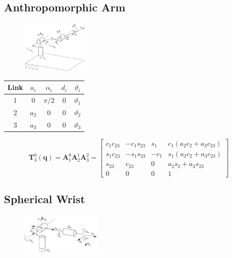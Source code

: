 \documentclass[10pt]{article}
\begin{document}
\subsection{Anthropomorphic Arm}

\begin{figure}[H]
    \centering
   \includegraphics[max width=0.3\textwidth]{./kinematics/anthropomorphic_arm}
\end{figure}

\begin{table}[h]
    \centering
\begin{tabular}{ccccc}
\hline
Link & $a_{i}$ & $\alpha_{i}$ & $d_{i}$ & $\vartheta_{i}$ \\
\hline
1 & 0 & $\pi / 2$ & 0 & $\vartheta_{1}$ \\
2 & $a_{2}$ & 0 & 0 & $\vartheta_{2}$ \\
3 & $a_{3}$ & 0 & 0 & $\vartheta_{3}$ \\
\hline
\end{tabular}
    \label{c1.l2.table.anthropomorphic}
\end{table}



$$
\boldsymbol{T}_{3}^{0}(\boldsymbol{q})=\boldsymbol{A}_{1}^{0} \boldsymbol{A}_{2}^{1} \boldsymbol{A}_{3}^{2}=\left[\begin{array}{cccc}
c_{1} c_{23} & -c_{1} s_{23} & s_{1} & c_{1}\left(a_{2} c_{2}+a_{3} c_{23}\right) \\
s_{1} c_{23} & -s_{1} s_{23} & -c_{1} & s_{1}\left(a_{2} c_{2}+a_{3} c_{23}\right) \\
s_{23} & c_{23} & 0 & a_{2} s_{2}+a_{3} s_{23} \\
0 & 0 & 0 & 1
\end{array}\right]
$$



\subsection{Spherical Wrist}

\begin{figure}[H]
    \centering
   \includegraphics[max width=0.35\textwidth]{./kinematics/spherical_wrist}
\end{figure}
\end{document}
